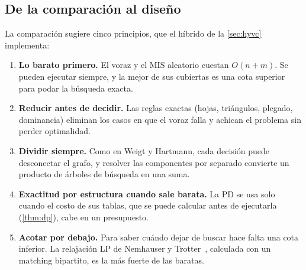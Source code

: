 \subsection{De la comparación al diseño}\label{sec:principios}
La comparación sugiere cinco principios, que el híbrido de la \cref{sec:hyvc} implementa:
\begin{enumerate}
  \item \textbf{Lo barato primero.} El voraz y el MIS aleatorio cuestan $O(n+m)$. Se pueden ejecutar siempre, y la mejor de sus cubiertas es una cota superior para podar la búsqueda exacta.
  \item \textbf{Reducir antes de decidir.} Las reglas exactas (hojas, triángulos, plegado, dominancia) eliminan los casos en que el voraz falla y achican el problema sin perder optimalidad.
  \item \textbf{Dividir siempre.} Como en Weigt y Hartmann, cada decisión puede desconectar el grafo, y resolver las componentes por separado convierte un producto de árboles de búsqueda en una suma.
  \item \textbf{Exactitud por estructura cuando sale barata.} La PD se usa solo cuando el costo de sus tablas, que se puede calcular antes de ejecutarla (\cref{thm:dp}), cabe en un presupuesto.
  \item \textbf{Acotar por debajo.} Para saber cuándo dejar de buscar hace falta una cota inferior. La relajación LP de Nemhauser y Trotter~\citep{nemhauser1975}, calculada con un matching bipartito, es la más fuerte de las baratas.
\end{enumerate}
